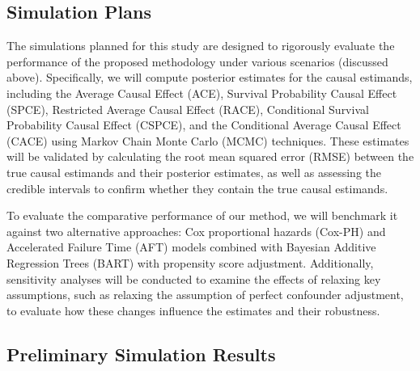 \documentclass[useAMS,referee]{biom}
\begin{document}
\subsection{Simulation Plans}
The simulations planned for this study are designed to rigorously evaluate the performance of the proposed methodology under various scenarios (discussed above). Specifically, we will compute posterior estimates for the causal estimands, including the Average Causal Effect (ACE), Survival Probability Causal Effect (SPCE), Restricted Average Causal Effect (RACE), Conditional Survival Probability Causal Effect (CSPCE), and the Conditional Average Causal Effect (CACE) using Markov Chain Monte Carlo (MCMC) techniques. These estimates will be validated by calculating the root mean squared error (RMSE) between the true causal estimands and their posterior estimates, as well as assessing the credible intervals to confirm whether they contain the true causal estimands.

To evaluate the comparative performance of our method, we will benchmark it against two alternative approaches: Cox proportional hazards (Cox-PH) and Accelerated Failure Time (AFT) models combined with Bayesian Additive Regression Trees (BART) with propensity score adjustment. Additionally, sensitivity analyses will be conducted to examine the effects of relaxing key assumptions, such as relaxing the assumption of perfect confounder adjustment, to evaluate how these changes influence the estimates and their robustness.
\subsection{Preliminary Simulation Results}
\end{document}
